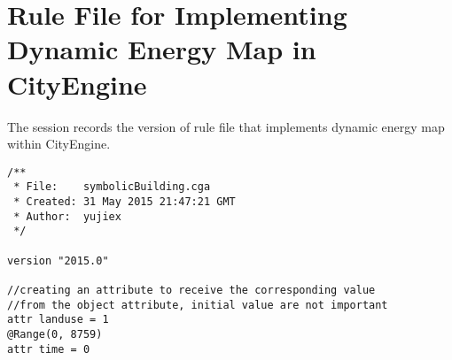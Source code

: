 \chapter{Rule File for Implementing Dynamic Energy Map in
  CityEngine} %

\label{AppendixB} %


The session records the version of rule file that implements dynamic
energy map within CityEngine.

\makeatletter
\def\verbatim@font{\linespread{1}\tiny\ttfamily}
\makeatother

\begin{multicols}{2}
\begin{verbatim}
/**
 * File:    symbolicBuilding.cga
 * Created: 31 May 2015 21:47:21 GMT
 * Author:  yujiex
 */

version "2015.0"

//creating an attribute to receive the corresponding value 
//from the object attribute, initial value are not important
attr landuse = 1
@Range(0, 8759)
attr time = 0


\end{verbatim}
\end{multicols}

